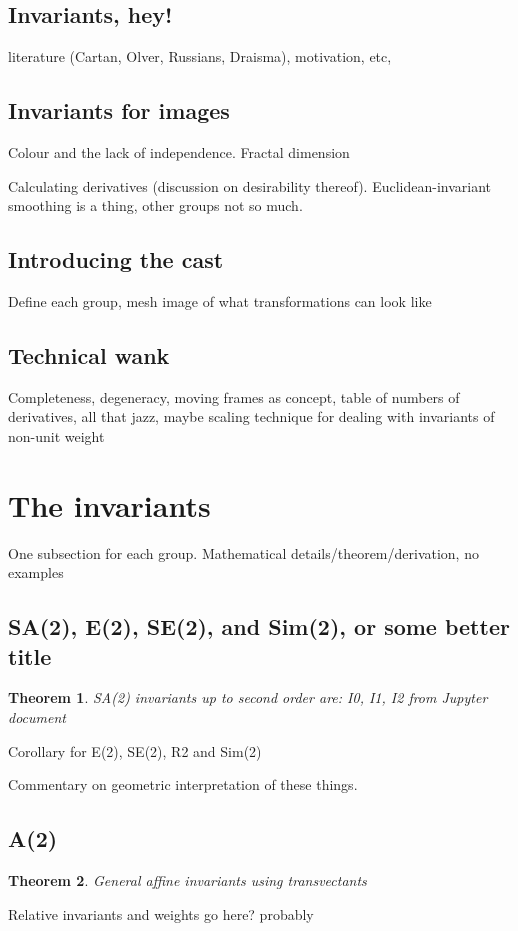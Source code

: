 \documentclass{article}
\newtheorem{theorem}{Theorem}
\begin{document}
\subsection{Invariants, hey!}
literature (Cartan, Olver, Russians, Draisma), motivation, etc,

\subsection{Invariants for images}
Colour and the lack of independence. Fractal dimension 

Calculating derivatives (discussion on desirability thereof).
Euclidean-invariant smoothing is a thing, other groups not so much.

\subsection{Introducing the cast}
Define each group, mesh image of what transformations can look like

\subsection{Technical wank}
Completeness, degeneracy, moving frames as concept, table of numbers of
derivatives, all that jazz, maybe scaling technique
for dealing with invariants of non-unit weight


\section{The invariants}
One subsection for each group. Mathematical details/theorem/derivation, no
examples
\subsection{SA(2), E(2), SE(2), and Sim(2), or some better title}
\begin{theorem}
  SA(2) invariants up to second order are:
  I0, I1, I2 from Jupyter document
\end{theorem}

Corollary for E(2), SE(2), R2 and Sim(2)

Commentary on geometric interpretation of these things.
\subsection{A(2)}
\begin{theorem}
  General affine invariants using transvectants
\end{theorem}
Relative invariants and weights go here? probably
\end{document}
